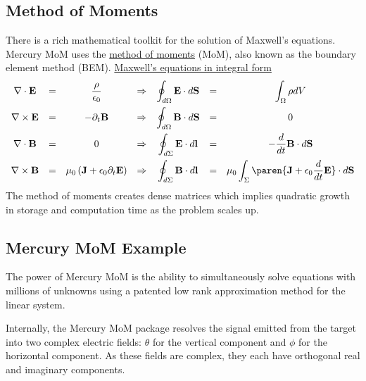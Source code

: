 \subsection{Method of Moments}
There is a rich mathematical toolkit for the solution of Maxwell's equations. Mercury MoM uses the \href{https://en.wikipedia.org/wiki/Computational_electromagnetics#Method_of_moments_element_method}{method of moments} (MoM), also known as the boundary element method (BEM).
\href{https://en.wikipedia.org/wiki/Maxwell\%27s\_equations}{Maxwell's equations in integral form}
\begin{equation}
	\begin{array}{cccccccccc}
		\nabla \cdot \mathbf{E} &= &\displaystyle\frac{\rho}{\epsilon_{0}} 
			&\Rightarrow &\displaystyle{\oint_{d\Omega} \mathbf{E}\cdot d\mathbf{S}} &= &\displaystyle\int_{\Omega} \rho dV \\[10pt]
		\nabla \times \mathbf{E} &= &- \partial_{t}\mathbf{B} 
			&\Rightarrow &\displaystyle\oint_{d\Omega} \mathbf{B}\cdot d\mathbf{S} &= &0 \\[10pt]
		\nabla \cdot \mathbf{B} &= &0
			&\Rightarrow &\displaystyle\oint_{d\Sigma} \mathbf{E}\cdot d\mathbf{l} &= &\displaystyle-\frac{d}{dt} \mathbf{B}\cdot d\mathbf{S} \\[10pt]
		\nabla \times \mathbf{B} &= &\mu_{0} \left( \mathbf{J} + \epsilon_{0} \partial_{t}\mathbf{E} \right) 
			&\Rightarrow & \displaystyle\oint_{d\Sigma} \mathbf{B}\cdot d\mathbf{l} &= &\displaystyle\mu_{0} \int_{\Sigma} \paren{ \mathbf{J}+ \epsilon_{0} \frac{d}{dt}  \mathbf{E} } \cdot d\mathbf{S} \\
	\end{array}
\label{eq:Maxwell-differential}
\end{equation}
The method of moments creates dense matrices which implies quadratic growth in storage and computation time as the problem scales up. 

\subsection{Mercury MoM Example}
The power of Mercury MoM is the ability to simultaneously solve equations with millions of unknowns using a patented low rank approximation method for the linear system.

Internally, the Mercury MoM package resolves the signal emitted from the target into two complex electric fields: $\theta$ for the vertical component and $\phi$ for the horizontal component. As these fields are complex, they each have orthogonal real and imaginary components. 

